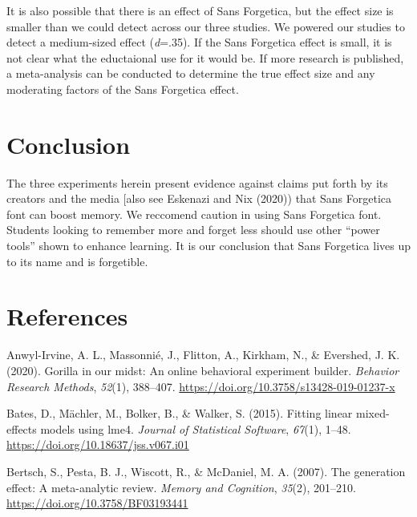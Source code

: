 \documentclass[english,doc]{apa6}
\begin{document}
It is also possible that there is an effect of Sans Forgetica, but the effect size is smaller than we could detect across our three studies. We powered our studies to detect a medium-sized effect (\emph{d}=.35). If the Sans Forgetica effect is small, it is not clear what the eductaional use for it would be. If more research is published, a meta-analysis can be conducted to determine the true effect size and any moderating factors of the Sans Forgetica effect.

\hypertarget{conclusion}{%
\section{Conclusion}\label{conclusion}}

The three experiments herein present evidence against claims put forth by its creators and the media {[}also see Eskenazi and Nix (2020)) that Sans Forgetica font can boost memory. We reccomend caution in using Sans Forgetica font. Students looking to remember more and forget less should use other \enquote{power tools} shown to enhance learning. It is our conclusion that Sans Forgetica lives up to its name and is forgetible.

\newpage

\hypertarget{references}{%
\section{References}\label{references}}

\begingroup
\setlength{\parindent}{-0.5in}
\setlength{\leftskip}{0.5in}

\hypertarget{refs}{}
\leavevmode\hypertarget{ref-Anwyl-Irvine2020}{}%
Anwyl-Irvine, A. L., Massonnié, J., Flitton, A., Kirkham, N., \& Evershed, J. K. (2020). Gorilla in our midst: An online behavioral experiment builder. \emph{Behavior Research Methods}, \emph{52}(1), 388--407. \url{https://doi.org/10.3758/s13428-019-01237-x}

\leavevmode\hypertarget{ref-Bates2015}{}%
Bates, D., Mächler, M., Bolker, B., \& Walker, S. (2015). Fitting linear mixed-effects models using lme4. \emph{Journal of Statistical Software}, \emph{67}(1), 1--48. \url{https://doi.org/10.18637/jss.v067.i01}

\leavevmode\hypertarget{ref-Bertsch2007}{}%
Bertsch, S., Pesta, B. J., Wiscott, R., \& McDaniel, M. A. (2007). The generation effect: A meta-analytic review. \emph{Memory and Cognition}, \emph{35}(2), 201--210. \url{https://doi.org/10.3758/BF03193441}
\end{document}

